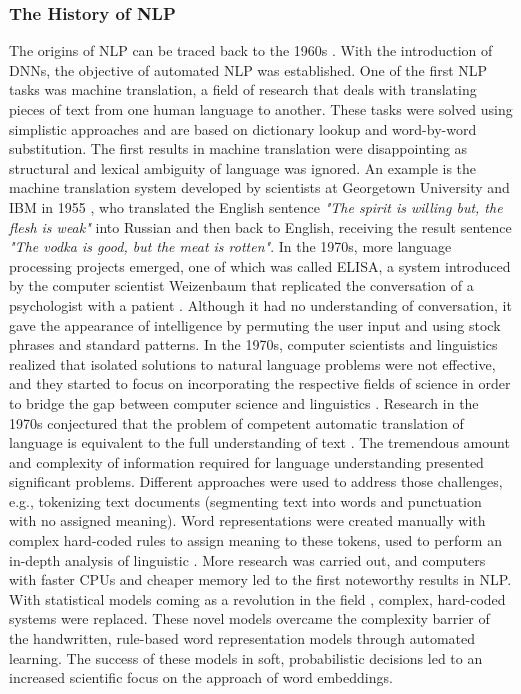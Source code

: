 \subsubsection{The History of NLP}
\label{sec:the_history_of_NLP}
The origins of NLP can be traced back to the 1960s \cite{dostert1955georgetown, Hutchins2006TheFP}. With the introduction of DNNs, the objective of automated NLP was established. One of the first NLP tasks was machine translation, a field of research that deals with translating pieces of text from one human language to another. These tasks were solved using simplistic approaches and are based on dictionary lookup and word-by-word substitution. 
The first results in machine translation were disappointing as structural and lexical ambiguity of language was ignored. An example is the machine translation system developed by scientists at Georgetown University and IBM in 1955 \cite{dostert1955georgetown}, who translated the English sentence \textit{"The spirit is willing but, the flesh is weak"} into Russian and then back to English, receiving the result sentence \textit{"The vodka is good, but the meat is rotten"}.
In the 1970s, more language processing projects emerged, one of which was called ELISA, a system introduced by the computer scientist Weizenbaum that replicated the conversation of a psychologist with a patient \cite{weizenbaum1966eliza}. Although it had no understanding of conversation, it gave the appearance of intelligence by permuting the user input and using stock phrases and standard patterns. In the 1970s, computer scientists and linguistics realized that isolated solutions to natural language problems were not effective, and they started to focus on incorporating the respective fields of science in order to bridge the gap between computer science and linguistics \cite{kumar2011natural}. 
Research in the 1970s conjectured that the problem of competent automatic translation of language is equivalent to the full understanding of text \cite{carbonell1981steps}. The tremendous amount and complexity of information required for language understanding presented significant problems. Different approaches were used to address those challenges, e.g., tokenizing text documents (segmenting text into words and punctuation with no assigned meaning). Word representations were created manually with complex hard-coded rules to assign meaning to these tokens, used to perform an in-depth analysis of linguistic \cite{catania1972chomsky}. 
More research was carried out, and computers with faster CPUs and cheaper memory led to the first noteworthy results in NLP. With statistical models coming as a revolution in the field \cite{bahl1989tree}, complex, hard-coded systems were replaced. 
These novel models overcame the complexity barrier of the handwritten, rule-based word representation models through automated learning. The success of these models in soft, probabilistic decisions led to an increased scientific focus on the approach of word embeddings.
 
